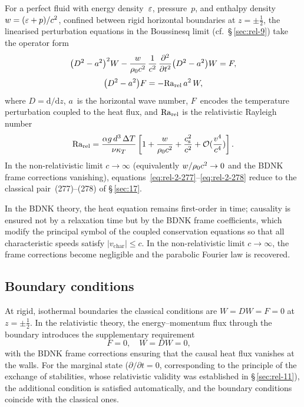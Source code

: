 For a perfect fluid with energy density~$\varepsilon$, pressure~$p$, and
enthalpy density $w = (\varepsilon + p)/c^{2}$, confined between rigid
horizontal boundaries at $z = \pm\tfrac{1}{2}$, the linearised
perturbation equations in the Boussinesq limit
(cf.\ \S\,\ref{sec:rel-9}) take the operator form
\begin{equation}\label{eq:rel-2-277}
  \bigl(D^{2} - a^{2}\bigr)^{2} W
  - \frac{w}{\rho_0 c^{2}}\,\frac{1}{c^{2}}\,
    \frac{\partial^{2}}{\partial t^{2}}
    \bigl(D^{2} - a^{2}\bigr) W
  = F,
\end{equation}
\begin{equation}\label{eq:rel-2-278}
  \bigl(D^{2} - a^{2}\bigr) F
  = -\mathrm{Ra}_{\mathrm{rel}}\, a^{2}\, W,
\end{equation}
where $D = \mathrm{d}/\mathrm{d}z$, $a$~is the horizontal wave number,
$F$~encodes the temperature perturbation coupled to the heat flux, and
$\mathrm{Ra}_{\mathrm{rel}}$ is the relativistic Rayleigh number
\begin{equation}\label{eq:rel-Ra-def-sec17}
  \mathrm{Ra}_{\mathrm{rel}} = \frac{\alpha g\, d^{3}\,\Delta T}{\nu\kappa_{T}}
    \left[
      1
      + \frac{w}{\rho_0 c^{2}}
      + \frac{c_{\mathrm{s}}^{2}}{c^{2}}
      + \mathcal{O}(\frac{v^{4}}{c^{4}})
    \right].
\end{equation}
In the non-relativistic limit $c\to\infty$ (equivalently
$w/\rho_0 c^{2}\to 0$ and the BDNK frame corrections
vanishing), equations~\eqref{eq:rel-2-277}--\eqref{eq:rel-2-278}
reduce to the classical pair~(277)--(278) of \S\,\ref{sec:17}.

\begin{causalitycheck}
In the BDNK theory, the heat equation remains first-order in time;
causality is ensured not by a relaxation time but by the BDNK frame
coefficients, which modify the principal symbol of the coupled
conservation equations so that all characteristic speeds satisfy
$|v_{\mathrm{char}}| \leq c$.  In the non-relativistic limit
$c\to\infty$, the frame corrections become negligible and the
parabolic Fourier law is recovered.
\end{causalitycheck}

\subsection{Boundary conditions}

At rigid, isothermal boundaries the classical conditions are
$W = DW = F = 0$ at $z=\pm\tfrac{1}{2}$.  In the relativistic theory,
the energy--momentum flux through the boundary introduces the
supplementary requirement
\begin{equation}\label{eq:rel-2-279}
  F = 0,\quad W = DW = 0,\quad
  \end{equation}
with the BDNK frame corrections ensuring that the causal heat flux
vanishes at the walls.  For the marginal state ($\partial/\partial t = 0$, corresponding
to the principle of the exchange of stabilities, whose relativistic
validity was established in \S\,\ref{sec:rel-11}), the additional
condition is satisfied automatically, and the boundary conditions
coincide with the classical ones.

